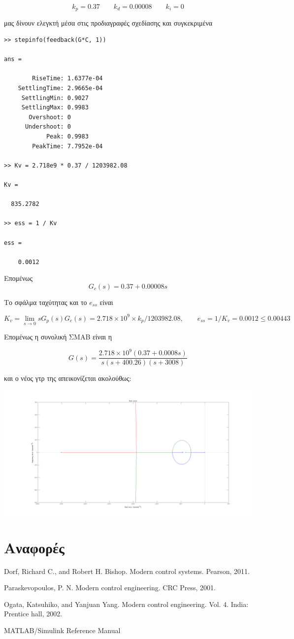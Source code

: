 \documentclass[a4paper,oneside, 10pt]{article}
\begin{document}
$$k_p = 0.37  \qquad k_d = 0.00008 \qquad k_i  = 0$$  

μας δίνουν ελεγκτή μέσα στις προδιαγραφές σχεδίασης και συγκεκριμένα

\begin{verbatim}
>> stepinfo(feedback(G*C, 1))

ans = 

        RiseTime: 1.6377e-04
    SettlingTime: 2.9665e-04
     SettlingMin: 0.9027
     SettlingMax: 0.9983
       Overshoot: 0
      Undershoot: 0
            Peak: 0.9983
        PeakTime: 7.7952e-04

>> Kv = 2.718e9 * 0.37 / 1203982.08

Kv =

  835.2782

>> ess = 1 / Kv

ess =

    0.0012

\end{verbatim}
  
Επομένως $$G_c(s) = 0.37 + 0.00008s$$  
  
  
Το σφάλμα ταχύτητας και το $e_{ss}$ είναι 

$$K_v = \lim_{s \to 0} s G_p(s) G_c(s) = 2.718 \times 10^9 \times k_p / 1203982.08, \qquad e_{ss} = 1 / K_v = 0.0012 \le 0.00443 $$  
  
Επομένως η συνολική ΣΜΑΒ είναι η 

$$G(s) = \frac {2.718 \times 10^9 (0.37 + 0.0008s)} {s(s + 400.26)(s + 3008)}$$  

και ο νέος γτρ της απεικονίζεται ακολούθως:

 \includegraphics[width=\textwidth]{pd2_rlocus.png}




\section*{Αναφορές}

\noindent [1] Dorf, Richard C., and Robert H. Bishop. Modern control systems. Pearson, 2011.

\noindent [2] Paraskevopoulos, P. N. Modern control engineering. CRC Press, 2001.

\noindent [3] Ogata, Katsuhiko, and Yanjuan Yang. Modern control engineering. Vol. 4. India: Prentice hall, 2002.

\noindent [4] MATLAB/Simulink Reference Manual
\end{document}

